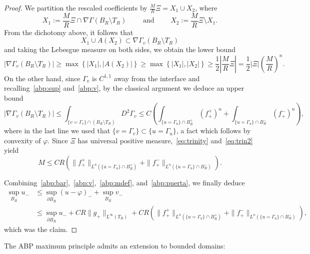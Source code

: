 \documentclass[letter,11pt]{amsart}
\theoremstyle{definition}
\numberwithin{equation}{section}
\begin{document}
\begin{proof}
We partition the rescaled coefficients by $\frac{M}{R}\Xi = X_1 \cup X_2$, where
\[
X_1 := \textstyle\frac{M}{R}\Xi
\cap \nabla \Gamma(B_R \setminus T_R)
\qquad \text{ and } \qquad 
X_2 := \textstyle \frac{M}{R}\Xi \setminus X_1.
\]
From the dichotomy above, it follows that
\[
X_1 \cup A(X_2) \subset \nabla \Gamma_{v}(B_R \setminus T_R)
\]
and taking the Lebesgue measure on both sides, we obtain the lower bound
\begin{equation}
\label{eq:trinity}
|\nabla \Gamma_{v}(B_R \setminus T_R)| \geq \max\left\{|X_1|, |A(X_2)| \right\} \geq \max\left\{|X_1|, |X_2| \right\} \geq \frac{1}{2}\left|\frac{M}{R}\Xi\right| = \frac{1}{2} |\Xi| \left(\frac{M}{R}\right)^{n}.
\end{equation}
On the other hand, since $\Gamma_v$ is $C^{1,1}$ away from the interface and recalling~\eqref{abp:sup} and~\eqref{abp:v}, by the classical argument we deduce an upper bound
\begin{equation}
\label{eq:trin2}
|\nabla \Gamma_{v}(B_R \setminus T_R)|
\leq \int_{\{v = \Gamma_v\}\cap (B_R\setminus T_R)} D^2 \Gamma_{v}
\leq C \left( \int_{\{u = \Gamma_u\}\cap B_R^{+}} (f_{+}^{+})^{n} 
+ \int_{\{u = \Gamma_u\}\cap B_R^{-}} (f_{+}^{-})^{n}
\right),
\end{equation}
where in the last line we used that $\{v = \Gamma_v\} \subset \{u = \Gamma_u\}$, a fact which follows by convexity of $\varphi$.
Since $\Xi$ has universal positive measure,~\eqref{eq:trinity} and~\eqref{eq:trin2} yield
\begin{equation}
\label{abp:puerta}
M \leq C R \left(\|f_{+}^{+}\|_{L^{n}(\{u = \Gamma_{u}\}\cap B_R^{+} )} + \|f_{+}^{-}\|_{L^{n}(\{u = \Gamma_{u}\}\cap B_R^{-} )}\right).
\end{equation}

\medskip

Combining~\eqref{abp:bar},~\eqref{abp:v},~\eqref{abp:mdef}, and~\eqref{abp:puerta}, we finally deduce
\[
\begin{split}
\sup_{B_R} u_{-}
&\leq \sup_{\partial B_R} (u-\varphi)_{-} + \sup_{B_R} v_{-}\\
&\leq \sup_{\partial B_R} u_{-}+ C R \|g_{+}\|_{L^{\infty}(T_R)} + C R \left(  
\|f_{+}^{+}\|_{L^{n}(\{u = \Gamma_{u}\}\cap B_R^{+} )} + \|f_{+}^{-}\|_{L^{n}(\{u = \Gamma_{u}\}\cap B_R^{-} )}
\right),
\end{split}
\]
which was the claim.
\end{proof}

\medskip

The ABP maximum principle admits an extension to bounded domains:
\end{document}
